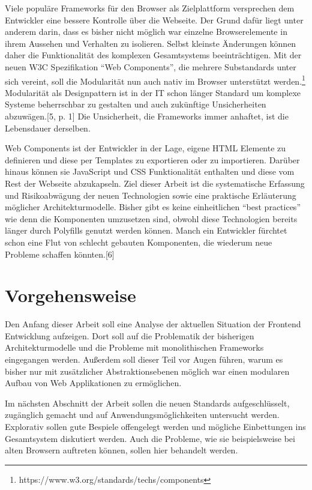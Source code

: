Viele populäre Frameworks für den Browser als Zielplattform versprechen
dem Entwickler eine bessere Kontrolle über die Webseite. Der Grund dafür
liegt unter anderem darin, dass es bisher nicht möglich war einzelne
Browserelemente in ihrem Aussehen und Verhalten zu isolieren. Selbst
kleinste Änderungen können daher die Funktionalität des komplexen
Gesamtsystems beeinträchtigen. Mit der neuen W3C Spezifikation ``Web
Components'', die mehrere Substandards unter sich vereint, soll die
Modularität nun auch nativ im Browser unterstützt werden.\footnote{https://www.w3.org/standards/techs/components}
Modularität als Designpattern ist in der IT schon länger Standard um
komplexe Systeme beherrschbar zu gestalten und auch zukünftige
Unsicherheiten abzuwägen.{[}5, p. 1{]} Die Unsicherheit, die Frameworks
immer anhaftet, ist die Lebensdauer derselben.

Web Components ist der Entwickler in der Lage, eigene HTML Elemente zu
definieren und diese per Templates zu exportieren oder zu importieren.
Darüber hinaus können sie JavaScript und CSS Funktionalität enthalten
und diese vom Rest der Webseite abzukapseln. Ziel dieser Arbeit ist die
systematische Erfassung und Risikoabwägung der neuen Technologien sowie
eine praktische Erläuterung möglicher Architekturmodelle. Bisher gibt es
keine einheitlichen ``best practices'' wie denn die Komponenten
umzusetzen sind, obwohl diese Technologien bereits länger durch
Polyfills genutzt werden können. Manch ein Entwickler fürchtet schon
eine Flut von schlecht gebauten Komponenten, die wiederum neue Probleme
schaffen könnten.{[}6{]}

\section{Vorgehensweise}\label{vorgehensweise}

Den Anfang dieser Arbeit soll eine Analyse der aktuellen Situation der
Frontend Entwicklung aufzeigen. Dort soll auf die Problematik der
bisherigen Architekturmodelle und die Probleme mit monolithischen
Frameworks eingegangen werden. Außerdem soll dieser Teil vor Augen
führen, warum es bisher nur mit zusätzlicher Abstraktionsebenen möglich
war einen modularen Aufbau von Web Applikationen zu ermöglichen.

Im nächsten Abschnitt der Arbeit sollen die neuen Standards
aufgeschlüsselt, zugänglich gemacht und auf Anwendungsmöglichkeiten
untersucht werden. Explorativ sollen gute Bespiele offengelegt werden
und mögliche Einbettungen ins Gesamtsystem diskutiert werden. Auch die
Probleme, wie sie beispielsweise bei alten Browsern auftreten können,
sollen hier behandelt werden.


